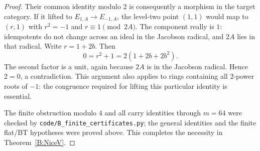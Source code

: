 \begin{proof}
Their common identity modulo $2$ is consequently a morphism in the
target category. If it lifted to $E_{1,A}\to E_{-1,A}$, the level-two
point $(1,1)$ would map to $(r,1)$ with $r^2=-1$ and $r\equiv1\pmod{2A}$.
The component really is $1$: idempotents do not change across an
ideal in the Jacobson radical, and $2A$ lies in that radical.
Write $r=1+2b$. Then
\[
 0=r^2+1=2(1+2b+2b^2).
\]
The second factor is a unit, again because $2A$ is in the Jacobson
radical. Hence $2=0$, a contradiction. This argument also applies to
rings containing all $2$-power roots of $-1$: the congruence required
for lifting this particular identity is essential.

The finite obstruction modulo $4$ and all carry identities through
$m=64$ were checked by \texttt{code/B\_finite\_certificates.py}; the
general identities and the finite flat/BT hypotheses were proved
above. This completes the necessity in Theorem~\ref{B:NiceV}.
\end{proof}

